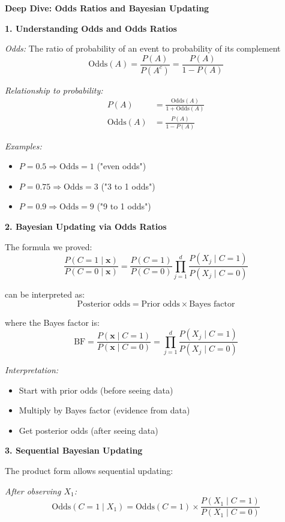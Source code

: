 \documentclass[12pt]{article}
\begin{document}
\begin{explanation}
\textbf{Deep Dive: Odds Ratios and Bayesian Updating}

\textbf{1. Understanding Odds and Odds Ratios}

\textit{Odds:} The ratio of probability of an event to probability of its complement
\[
\text{Odds}(A) = \frac{P(A)}{P(A^c)} = \frac{P(A)}{1-P(A)}
\]

\textit{Relationship to probability:}
\begin{align}
P(A) &= \frac{\text{Odds}(A)}{1 + \text{Odds}(A)} \\
\text{Odds}(A) &= \frac{P(A)}{1-P(A)}
\end{align}

\textit{Examples:}
\begin{itemize}
    \item $P = 0.5 \Rightarrow \text{Odds} = 1$ ("even odds")
    \item $P = 0.75 \Rightarrow \text{Odds} = 3$ ("3 to 1 odds")
    \item $P = 0.9 \Rightarrow \text{Odds} = 9$ ("9 to 1 odds")
\end{itemize}

\textbf{2. Bayesian Updating via Odds Ratios}

The formula we proved:
\[
\frac{P(C=1 \mid \mathbf{x})}{P(C=0 \mid \mathbf{x})} = \frac{P(C=1)}{P(C=0)} \prod_{j=1}^{d} \frac{P(X_j \mid C=1)}{P(X_j \mid C=0)}
\]

can be interpreted as:
\[
\text{Posterior odds} = \text{Prior odds} \times \text{Bayes factor}
\]

where the Bayes factor is:
\[
\text{BF} = \frac{P(\mathbf{x} \mid C=1)}{P(\mathbf{x} \mid C=0)} = \prod_{j=1}^{d} \frac{P(X_j \mid C=1)}{P(X_j \mid C=0)}
\]

\textit{Interpretation:}
\begin{itemize}
    \item Start with prior odds (before seeing data)
    \item Multiply by Bayes factor (evidence from data)
    \item Get posterior odds (after seeing data)
\end{itemize}

\textbf{3. Sequential Bayesian Updating}

The product form allows sequential updating:

\textit{After observing $X_1$:}
\[
\text{Odds}(C=1 \mid X_1) = \text{Odds}(C=1) \times \frac{P(X_1 \mid C=1)}{P(X_1 \mid C=0)}
\]


\end{explanation}
\end{document}
